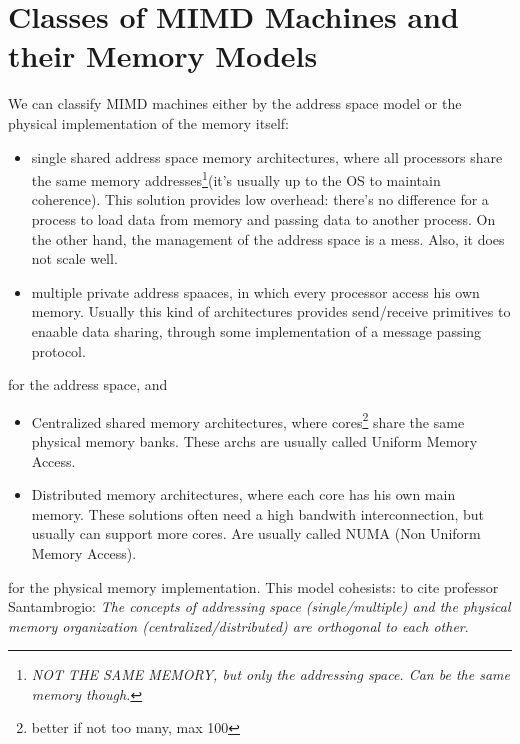 \documentclass[10pt,a4paper]{article}
\begin{document}
		\section{Classes of MIMD Machines and their Memory Models}
			We can classify MIMD machines either by the address space model or the physical implementation of the memory itself:
			\begin{itemize}
				\item single shared address space memory architectures, where all processors share the same memory addresses\footnote{\emph{NOT THE SAME MEMORY, but only the addressing space. Can be the same memory though.}}(it's usually up to the OS to maintain coherence). This solution provides low overhead: there's no difference for a process to load data from memory and passing data to another process. On the other hand, the management of the address space is a mess. Also, it does not scale well.
				\item multiple private address spaaces, in which every processor access his own memory. Usually this kind of architectures provides send/receive primitives to enaable data sharing, through some implementation of a message passing protocol. 
			\end{itemize}
			for the address space, and
			\begin{itemize}
				\item Centralized shared memory architectures, where cores\footnote{better if not too many, max 100} share the same physical memory banks. These archs are usually called Uniform Memory Access.
				\item Distributed memory architectures, where each core has his own main memory. These solutions often need a high bandwith interconnection, but usually can support more cores. Are usually called NUMA (Non Uniform Memory Access).
			\end{itemize}
			for the physical memory implementation. This model cohesists: to cite professor Santambrogio: \emph{The concepts of addressing space (single/multiple) and the physical memory organization (centralized/distributed) are orthogonal to each other}.
\end{document}
